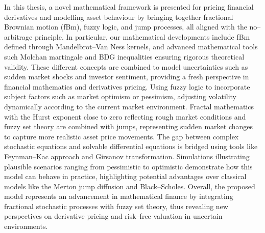 \documentclass[12pt,a4paper]{report}
\numberwithin{equation}{section}
\begin{document}
In this thesis, a novel mathematical framework is presented for pricing
financial derivatives and modelling asset behaviour by bringing together
fractional Brownian motion (fBm), fuzzy logic, and jump processes, all
aligned with the no--arbitrage principle. In particular, our mathematical
developments include fBm defined through Mandelbrot--Van Ness kernels,
and advanced mathematical tools such Molchan martingale and BDG
inequalities ensuring rigorous theoretical validity. These different concepts are combined to model uncertainties such as sudden market
shocks and investor sentiment, providing a fresh perspective in
financial mathematics and derivatives pricing. Using fuzzy logic to incorporate subject factors such as market optimism or pessimism,
adjusting volatility dynamically according to the current market
environment. Fractal mathematics with the Hurst exponent close to zero
reflecting rough market conditions and fuzzy set theory are combined
with jumps, representing sudden market changes to capture more realistic
asset price movements. The gap between complex stochastic
equations and solvable differential equations  is bridged using tools like
Feynman--Kac approach and Girsanov transformation. Simulations
illustrating plausible scenarios ranging from pessimistic to optimistic
demonstrate how this model can behave in practice, highlighting
potential advantages over classical models like the Merton jump
diffusion and Black--Scholes. Overall, the proposed model represents an
advancement in mathematical finance by integrating fractional stochastic
processes with fuzzy set theory, thus revealing new perspectives on
derivative pricing and risk--free valuation in uncertain environments.
\end{document}
